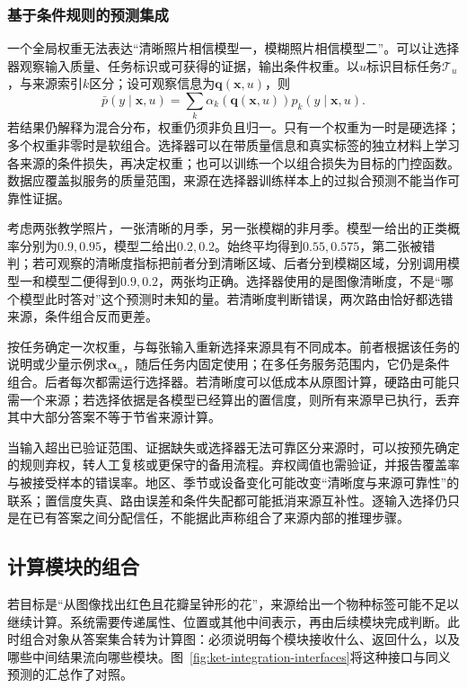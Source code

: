 \subsubsection{基于条件规则的预测集成}
\label{sec:ket-integration-conditional-prediction}

一个全局权重无法表达“清晰照片相信模型一，模糊照片相信模型二”。可以让选择器观察输入质量、任务标识或可获得的证据，输出条件权重。以$u$标识目标任务$\mathcal T_u$，与来源索引$k$区分；设可观察信息为$\bm{q}(\bm{x},u)$，则
\begin{equation}
  \bar p(y\mid\bm{x},u)
  =\sum_k\alpha_k(\bm{q}(\bm{x},u))p_k(y\mid\bm{x},u).
  \label{eq:ket-integration-conditional-average}
\end{equation}
若结果仍解释为混合分布，权重仍须非负且归一。只有一个权重为一时是硬选择；多个权重非零时是软组合。选择器可以在带质量信息和真实标签的独立材料上学习各来源的条件损失，再决定权重；也可以训练一个以组合损失为目标的门控函数。数据应覆盖拟服务的质量范围，来源在选择器训练样本上的过拟合预测不能当作可靠性证据。

考虑两张教学照片，一张清晰的月季，另一张模糊的非月季。模型一给出的正类概率分别为$0.9,0.95$，模型二给出$0.2,0.2$。始终平均得到$0.55,0.575$，第二张被错判；若可观察的清晰度指标把前者分到清晰区域、后者分到模糊区域，分别调用模型一和模型二便得到$0.9,0.2$，两张均正确。选择器使用的是图像清晰度，不是“哪个模型此时答对”这个预测时未知的量。若清晰度判断错误，两次路由恰好都选错来源，条件组合反而更差。

按任务确定一次权重，与每张输入重新选择来源具有不同成本。前者根据该任务的说明或少量示例求$\bm{\alpha}_u$，随后任务内固定使用；在多任务服务范围内，它仍是条件组合。后者每次都需运行选择器。若清晰度可以低成本从原图计算，硬路由可能只需一个来源；若选择依据是各模型已经算出的置信度，则所有来源早已执行，丢弃其中大部分答案不等于节省来源计算。

当输入超出已验证范围、证据缺失或选择器无法可靠区分来源时，可以按预先确定的规则弃权，转人工复核或更保守的备用流程。弃权阈值也需验证，并报告覆盖率与被接受样本的错误率。地区、季节或设备变化可能改变“清晰度与来源可靠性”的联系；置信度失真、路由误差和条件失配都可能抵消来源互补性。逐输入选择仍只是在已有答案之间分配信任，不能据此声称组合了来源内部的推理步骤。

\subsection{计算模块的组合}
\label{sec:ket-integration-modules}

若目标是“从图像找出红色且花瓣呈钟形的花”，来源给出一个物种标签可能不足以继续计算。系统需要传递属性、位置或其他中间表示，再由后续模块完成判断。此时组合对象从答案集合转为计算图：必须说明每个模块接收什么、返回什么，以及哪些中间结果流向哪些模块。图~\ref{fig:ket-integration-interfaces}将这种接口与同义预测的汇总作了对照。

